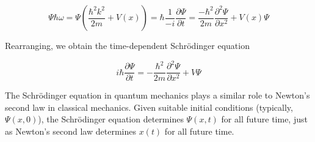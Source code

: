 \documentclass[a4paper,12pt]{report}
\begin{document}
\begin{equation}
  \Psi \hbar\omega = \Psi (\frac{\hbar ^2 k^2 }{2m} + V(x)) = \hbar \frac{1}{-i} \frac{\partial\Psi}{\partial t} = \frac{-\hbar ^2 }{2m} \frac{\partial^2\Psi }{\partial x^2} + V(x)\Psi \label{fma} 
\end{equation}

Rearranging, we obtain the time-dependent Schrödinger equation

\begin{equation}
  i \hbar \frac{\partial \Psi}{\partial t}=-\frac{\hbar^2}{2 m} \frac{\partial^2 \Psi}{\partial x^2}+V \Psi \label{scr}
\end{equation}

The Schrödinger equation in quantum mechanics plays a similar role to Newton's second law in classical mechanics. Given suitable initial conditions (typically, $\Psi(x, 0)$), the Schrödinger equation determines $\Psi(x, t)$ for all future time, just as Newton's second law determines $x(t)$ for all future time.
\end{document}
